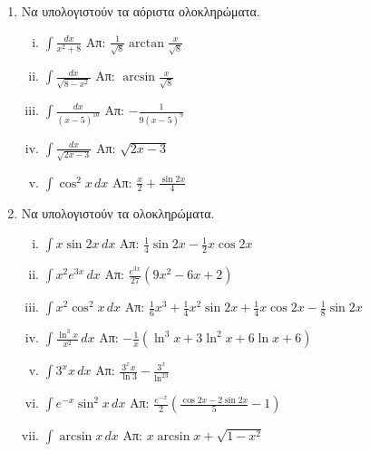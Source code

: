 


\everymath{\displaystyle}



\thispagestyle{empty}
\begin{center}
\end{center}
\vspace{\baselineskip}
\begin{enumerate}

\item Να υπολογιστούν τα αόριστα ολοκληρώματα.


\begin{enumerate}[i)]
\item $\int\frac{dx}{x^2+8} $ \hfill Απ: $\frac{1}{\sqrt{8}} \arctan \frac{x}{\sqrt{8}}$
\item $\int\frac{dx}{\sqrt{8-x^{2}}} $ \hfill Απ: $\arcsin \frac{x}{\sqrt{8}}$
\item $\int\frac{dx}{(x-5)^{10}} $ \hfill Απ: $-\frac{1}{9(x-5)^9}$
\item $ \int\frac{dx}{\sqrt{2x-3}}$ \hfill Απ: $ \sqrt{2x-3} $
\item $\int\cos^2x \, dx$ \hfill Απ: $\frac{x}{2} + \frac{\sin2x}{4}$
\end{enumerate}

\item Να υπολογιστούν τα ολοκληρώματα.

\begin{enumerate}[i)]
\item $\int x\sin2x \, dx$ \hfill Απ: $\frac{1}{4}\sin2x-\frac{1}{2}x\cos2x$
\item $\int x^2e^{3x} \, dx$ \hfill Απ: $\frac{e^{3x}}{27}(9x^2-6x+2)$
\item $\int x^2\cos^2x \, dx$ \hfill Απ: $\frac{1}{6}x^3 + \frac{1}{4}x^2\sin2x+\frac{1}{4}x\cos2x-\frac{1}{8}\sin2x$
\item $\int \frac{\ln^3x}{x^2} \, dx$ \hfill Απ: $-\frac{1}{x}(\ln^3x+3\ln^2x+6\ln x+6)$
\item $\int 3^{x}x \, dx$ \hfill Απ: $\frac{3^xx}{\ln3}-\frac{3^x}{\ln^23}$
\item $\int e^{-x}\sin^2x \, dx$ \hfill Απ: $\frac{e^{-x}}{2}\left(\frac{\cos2x-2\sin2x}{5}-1\right)$
\item $\int \arcsin x \, dx$ \hfill Απ: $x\arcsin x + \sqrt{1-x^2}$
\end{enumerate}


\end{enumerate}
